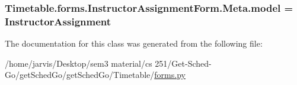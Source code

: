 \subsubsection[{\texorpdfstring{model}{model}}]{\setlength{\rightskip}{0pt plus 5cm}Timetable.\+forms.\+Instructor\+Assignment\+Form.\+Meta.\+model = {\bf Instructor\+Assignment}\hspace{0.3cm}{\ttfamily [static]}}\hypertarget{classTimetable_1_1forms_1_1InstructorAssignmentForm_1_1Meta_a7914c57f1630e7eb0ba4f6ec804fbfd5}{}\label{classTimetable_1_1forms_1_1InstructorAssignmentForm_1_1Meta_a7914c57f1630e7eb0ba4f6ec804fbfd5}


The documentation for this class was generated from the following file\+:\begin{DoxyCompactItemize}
\item 
/home/jarvis/\+Desktop/sem3 material/cs 251/\+Get-\/\+Sched-\/\+Go/get\+Sched\+Go/get\+Sched\+Go/\+Timetable/\hyperlink{Timetable_2forms_8py}{forms.\+py}\end{DoxyCompactItemize}
